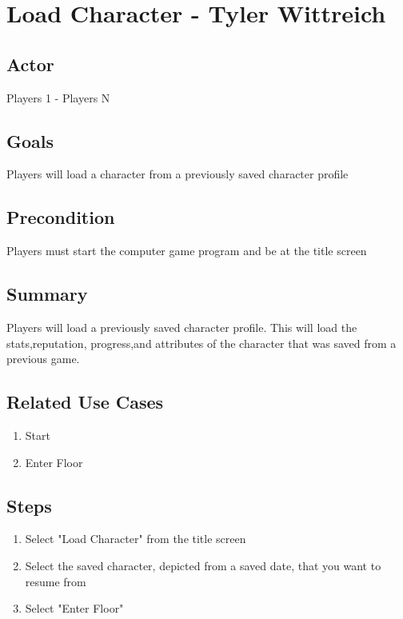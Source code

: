 \documentclass[10pt]{article}
\begin{document}
\newpage







\section{Load Character - Tyler Wittreich}

		\subsection{Actor}
		Players 1 - Players N
		
		
		\subsection{Goals}
 		Players will load a character from a previously saved character profile

		\subsection{Precondition}
 		Players must start the computer game program and be at the title screen

		\subsection{Summary}
		Players will load a previously saved character profile. This will load the stats,reputation, progress,and attributes of the character that was saved from a previous game.

		\subsection{Related Use Cases}
			 \begin{enumerate}
			    \item Start
			    \item Enter Floor
			 \end{enumerate}
	

        \subsection{Steps}
			\begin{enumerate}
			\item Select "Load Character" from the title screen
			\item Select the saved character, depicted from a saved date, that you want to resume from
			\item Select "Enter Floor"
			\end{enumerate}
			
\end{document}

